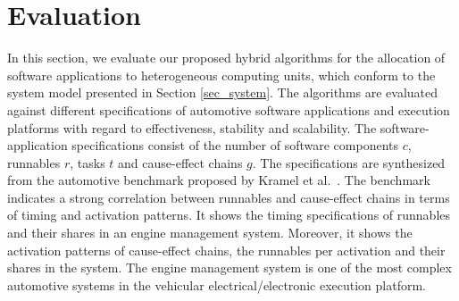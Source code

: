 \section{Evaluation}\label{sec_evaluation}
In this section, we evaluate our proposed hybrid \pso{} algorithms for the allocation of software applications to heterogeneous computing units, which conform to the system model presented in Section \ref{sec_system}. The algorithms are evaluated against different specifications of automotive software applications and execution platforms with regard to effectiveness, stability and scalability. The software-application specifications consist of the number of software components $c$, runnables $r$, tasks $t$ and cause-effect chains $g$.  The specifications are synthesized from the automotive benchmark proposed by Kramel et al.~\cite{Kramer2015RealFree}. The benchmark indicates a strong correlation between runnables and cause-effect chains in terms of timing and activation patterns. It shows the timing specifications of runnables and their shares in an engine management system. Moreover, it shows the activation patterns of cause-effect chains, the runnables per activation and their shares in the system. The engine management system is one of the most complex automotive systems in the vehicular electrical/electronic execution platform. 

